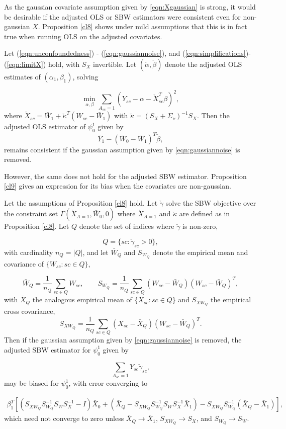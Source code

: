As the gaussian covariate assumption given by \eqref{eqn:Xgaussian} is strong, it would be desirable if the adjusted OLS or SBW estimators were consistent even for non-gaussian $X$. Proposition \ref{cl8} shows under mild assumptions that this is in fact true when running OLS on the adjusted covariates. 

\begin{proposition}\label{cl8}
Let (\ref{eqn:unconfoundedness}) - (\ref{eqn:gaussiannoise}), and (\ref{eqn:simplifications})- (\ref{eqn:limitX}) hold, with $S_X$ invertible. Let $(\check{\alpha}, \check{\beta})$ denote the adjusted OLS estimates of $(\alpha_1, \beta_1)$, solving

\[ \min_{\alpha,\beta} \sum_{A_{sc}=1} (Y_{sc} - \alpha - \check{X}_{sc}^T \beta)^2, \]
where $\check{X}_{sc} = \bar{W}_1 + \check{\kappa}^T(W_{sc} - \bar{W}_1)$ with $\check{\kappa} = (S_X + \Sigma_\nu)^{-1}S_X$. Then the adjusted OLS estimator of $\psi_0^1$ given by
\[ \bar{Y}_1 - (\bar{W}_0 - \bar{W}_1)^T \check{\beta},\]
remains consistent if the gaussian assumption given by \eqref{eqn:gaussiannoise} is removed.
\end{proposition}

However, the same does not hold for the adjusted SBW estimator. Proposition \ref{cl9} gives an expression for its bias when the covariates are non-gaussian. 

\begin{proposition}\label{cl9}
Let the assumptions of Proposition \ref{cl8} hold. Let $\check{\gamma}$ solve the SBW objective over the constraint set $\Gamma(\check{X}_{A=1}, \bar{W}_0, 0)$ where $\check{X}_{A=1}$ and $\check{\kappa}$ are defined as in Proposition \ref{cl8}. Let $Q$ denote the set of indices where $\check{\gamma}$ is non-zero,

\[ Q = \{sc: \check{\gamma}_{sc} > 0\},\]
with cardinality $n_Q = |Q|$, and let $\bar{W}_Q$ and $S_{W_Q}$ denote the empirical mean and covariance of $\{W_{sc}:sc \in Q\}$,

\[ \bar{W}_Q = \frac{1}{n_Q}\sum_{sc \in Q} W_{sc},\qquad S_{W_Q} = \frac{1}{n_Q} \sum_{sc \in Q} (W_{sc} - \bar{W}_Q)(W_{sc} - \bar{W}_Q)^T,\]
with $\bar{X}_Q$ the analogous empirical mean of $\{X_{sc}:sc \in Q\}$ and $S_{XW_Q}$ the empirical cross covariance,
\[ S_{XW_Q} = \frac{1}{n_Q} \sum_{sc \in Q} (X_{sc} - \bar{X}_Q)(W_{sc} - \bar{W}_Q)^T.\]
Then if the gaussian assumption given by \eqref{eqn:gaussiannoise} is removed, the adjusted SBW estimator for $\psi_0^1$ given by 

\[\sum_{A_{sc}=1} Y_{sc} \check{\gamma}_{sc},\]
may be biased for $\psi_0^1$, with error converging to

\begin{align*} \beta_1^T\left[(S_{XW_Q}S_{W_Q}^{-1}S_WS_X^{-1} - I)\bar{X}_0  + (\bar{X}_Q - S_{XW_Q}S_{W_Q}^{-1} S_W S_X^{-1} \bar{X}_1) - S_{XW_Q}S_{W_Q}^{-1}(\bar{X}_Q - \bar{X}_1)\right], 
\end{align*}
which need not converge to zero unless $\bar{X}_Q \to \bar{X}_1$, $S_{XW_Q} \to S_X$, and $S_{W_Q} \to S_W$.
\end{proposition}


